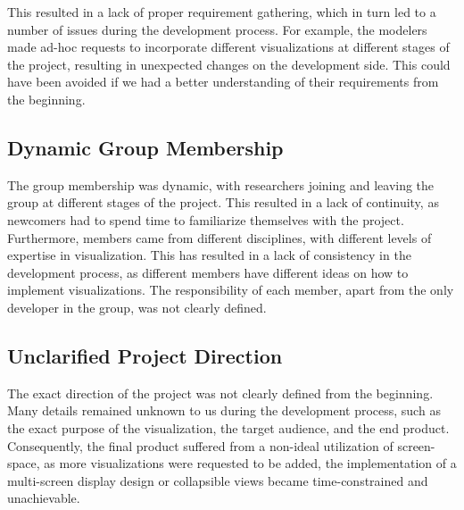 This resulted in a lack of proper requirement gathering, which in turn led to a number of issues during the development process.
For example, the modelers made ad-hoc requests to incorporate different visualizations at different stages of the project, resulting in unexpected changes on the development side.
This could have been avoided if we had a better understanding of their requirements from the beginning.

\subsection{Dynamic Group Membership}

The group membership was dynamic, with researchers joining and leaving the group at different stages of the project.
This resulted in a lack of continuity, as newcomers had to spend time to familiarize themselves with the project.
Furthermore, members came from different disciplines, with different levels of expertise in visualization.
This has resulted in a lack of consistency in the development process, as different members have different ideas on how to implement visualizations.
The responsibility of each member, apart from the only developer in the group, was not clearly defined.

\subsection{Unclarified Project Direction}

The exact direction of the project was not clearly defined from the beginning.
Many details remained unknown to us during the development process, such as the exact purpose of the visualization, the target audience, and the end product. 
Consequently, the final product suffered from a non-ideal utilization of screen-space, as more visualizations were requested to be added, the implementation of a multi-screen display design or collapsible views became time-constrained and unachievable.
